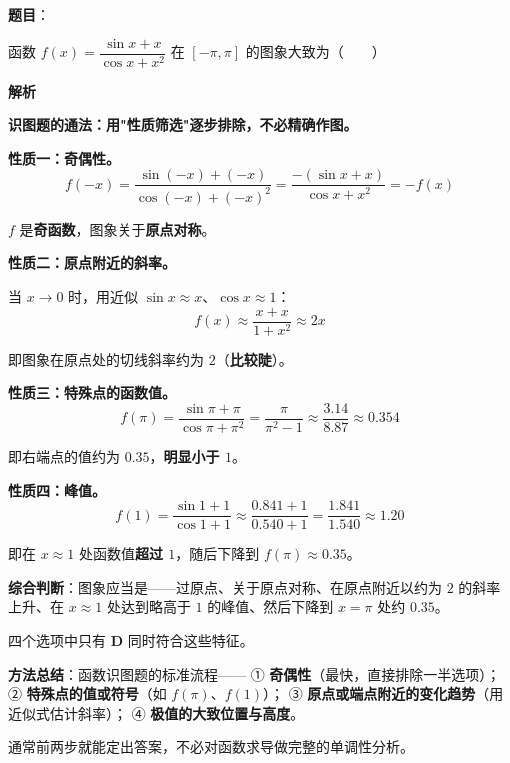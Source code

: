 \begin{answer}

\textbf{题目}：

函数 $f(x)=\dfrac{\sin x+x}{\cos x+x^{2}}$ 在 $[-\pi,\pi]$ 的图象大致为\mbox{（　　）}
\nopagebreak[4]
\begin{center}\end{center}
\nopagebreak[4]
\textbf{解析}

\textbf{识图题的通法：用"性质筛选"逐步排除，不必精确作图。}

\textbf{性质一：奇偶性。}
\nopagebreak[4]
\[f(-x)=\frac{\sin(-x)+(-x)}{\cos(-x)+(-x)^{2}}=\frac{-(\sin x+x)}{\cos x+x^{2}}=-f(x)\]

$f$ 是\textbf{奇函数}，图象关于\textbf{原点对称}。

\textbf{性质二：原点附近的斜率。}

当 $x\to0$ 时，用近似 $\sin x\approx x$、$\cos x\approx1$：
\nopagebreak[4]
\[f(x)\approx\frac{x+x}{1+x^{2}}\approx2x\]

即图象在原点处的切线斜率约为 $2$（\textbf{比较陡}）。

\textbf{性质三：特殊点的函数值。}
\nopagebreak[4]
\[f(\pi)=\frac{\sin\pi+\pi}{\cos\pi+\pi^{2}}=\frac{\pi}{\pi^{2}-1}\approx\frac{3.14}{8.87}\approx0.354\]

即右端点的值约为 $0.35$，\textbf{明显小于 $1$}。

\textbf{性质四：峰值。}
\nopagebreak[4]
\[f(1)=\frac{\sin1+1}{\cos1+1}\approx\frac{0.841+1}{0.540+1}=\frac{1.841}{1.540}\approx1.20\]

即在 $x\approx1$ 处函数值\textbf{超过 $1$}，随后下降到 $f(\pi)\approx0.35$。

\textbf{综合判断}：图象应当是——过原点、关于原点对称、在原点附近以约为 $2$ 的斜率上升、在 $x\approx1$ 处达到略高于 $1$ 的峰值、然后下降到 $x=\pi$ 处约 $0.35$。

四个选项中只有 \textbf{D} 同时符合这些特征。

\begin{gktip}
\textbf{方法总结}：函数识图题的标准流程——
① \textbf{奇偶性}（最快，直接排除一半选项）；
② \textbf{特殊点的值或符号}（如 $f(\pi)$、$f(1)$）；
③ \textbf{原点或端点附近的变化趋势}（用近似式估计斜率）；
④ \textbf{极值的大致位置与高度}。

通常前两步就能定出答案，不必对函数求导做完整的单调性分析。
\end{gktip}


\par\medskip

\end{answer}
